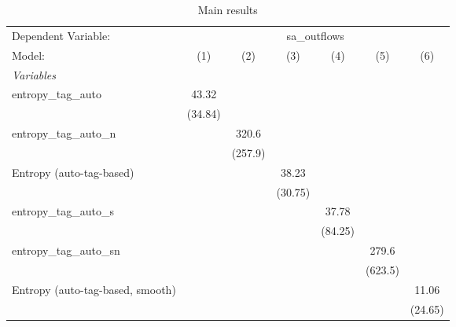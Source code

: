 
\begin{table}[htbp]
   \centering
   \caption{\label{tab:reg_sa_outflows_tag_auto.tex} Main results}
   \begin{footnotesize}
      \begin{tabular}{lcccccc}
         \tabularnewline\midrule\midrule
         Dependent Variable: & \multicolumn{6}{c}{sa\_outflows}\\
         Model:                           & (1)           & (2)           & (3)           & (4)           & (5)           & (6)\\
         \midrule \emph{Variables} &   &   &   &   &   &  \\
         entropy\_tag\_auto             & 43.32         &               &               &               &               &   \\
                                          & (34.84)       &               &               &               &               &   \\
         entropy\_tag\_auto\_n         &               & 320.6         &               &               &               &   \\
                                          &               & (257.9)       &               &               &               &   \\
         Entropy (auto-tag-based)         &               &               & 38.23         &               &               &   \\
                                          &               &               & (30.75)       &               &               &   \\
         entropy\_tag\_auto\_s         &               &               &               & 37.78         &               &   \\
                                          &               &               &               & (84.25)       &               &   \\
         entropy\_tag\_auto\_sn        &               &               &               &               & 279.6         &   \\
                                          &               &               &               &               & (623.5)       &   \\
         Entropy (auto-tag-based, smooth) &               &               &               &               &               & 11.06\\
                                          &               &               &               &               &               & (24.65)\\

\end{tabular}
\end{footnotesize}
\end{table}
